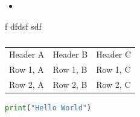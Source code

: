 \begin{itemize}
  \item 
\end{itemize}
f dfdsf sdf 
\begin{table}[h]
\centering
\begin{tabular}{l|l|l}
\hline
\hline
Header A & Header B & Header C \\
Row 1, A & Row 1, B & Row 1, C \\
Row 2, A & Row 2, B & Row 2, C
\hline
\hline
\end{tabular}
\caption{}
\end{table}

\begin{lstlisting}[language=Python]
print("Hello World")
\end{lstlisting}